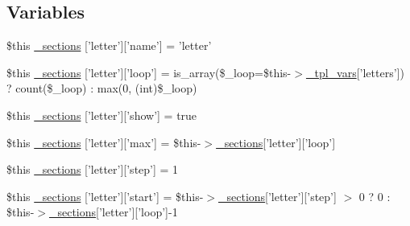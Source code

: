 \subsection*{\-Variables}
\begin{DoxyCompactItemize}
\item 
\$this \hyperlink{34d6fa4bfd5eef6424a9ddc74a166350_2_06_06-19_05_06_06-1910644431_05basicindex_8tpl_8php_ab61c28556ae2c3aa9f08b3c37b8d1dee}{\-\_\-sections} \mbox{[}'letter'\mbox{]}\mbox{[}'name'\mbox{]} = 'letter'
\item 
\$this \hyperlink{34d6fa4bfd5eef6424a9ddc74a166350_2_06_06-19_05_06_06-1910644431_05basicindex_8tpl_8php_ae48204adfd4d0ee93936b1c80c177329}{\-\_\-sections} \mbox{[}'letter'\mbox{]}\mbox{[}'loop'\mbox{]} = is\-\_\-array(\$\-\_\-loop=\$this-\/$>$\hyperlink{_06_06127_05_06_0612781687_05pkgelementindex_8tpl_8php_a4a4846d8e68d455590131a05697f67a3}{\-\_\-tpl\-\_\-vars}\mbox{[}'letters'\mbox{]}) ? count(\$\-\_\-loop) \-: max(0, (int)\$\-\_\-loop)
\item 
\$this \hyperlink{34d6fa4bfd5eef6424a9ddc74a166350_2_06_06-19_05_06_06-1910644431_05basicindex_8tpl_8php_a0df4abbde93015148031ad45c6ab77dd}{\-\_\-sections} \mbox{[}'letter'\mbox{]}\mbox{[}'show'\mbox{]} = true
\item 
\$this \hyperlink{34d6fa4bfd5eef6424a9ddc74a166350_2_06_06-19_05_06_06-1910644431_05basicindex_8tpl_8php_a37080233bfe88cede401c74aaa2c203d}{\-\_\-sections} \mbox{[}'letter'\mbox{]}\mbox{[}'max'\mbox{]} = \$this-\/$>$\hyperlink{_06_06127_05_06_0612781687_05pkgelementindex_8tpl_8php_a9e3d26b39edfe29c3f29b8035ef33828}{\-\_\-sections}\mbox{[}'letter'\mbox{]}\mbox{[}'loop'\mbox{]}
\item 
\$this \hyperlink{34d6fa4bfd5eef6424a9ddc74a166350_2_06_06-19_05_06_06-1910644431_05basicindex_8tpl_8php_a6337b688bdd972398487eb8159a4990b}{\-\_\-sections} \mbox{[}'letter'\mbox{]}\mbox{[}'step'\mbox{]} = 1
\item 
\$this \hyperlink{34d6fa4bfd5eef6424a9ddc74a166350_2_06_06-19_05_06_06-1910644431_05basicindex_8tpl_8php_a024abd6dfcb3c2d12aa3af3d9e5e2f7a}{\-\_\-sections} \mbox{[}'letter'\mbox{]}\mbox{[}'start'\mbox{]} = \$this-\/$>$\hyperlink{_06_06127_05_06_0612781687_05pkgelementindex_8tpl_8php_a9e3d26b39edfe29c3f29b8035ef33828}{\-\_\-sections}\mbox{[}'letter'\mbox{]}\mbox{[}'step'\mbox{]} $>$ 0 ? 0 \-: \$this-\/$>$\hyperlink{_06_06127_05_06_0612781687_05pkgelementindex_8tpl_8php_a9e3d26b39edfe29c3f29b8035ef33828}{\-\_\-sections}\mbox{[}'letter'\mbox{]}\mbox{[}'loop'\mbox{]}-\/1
\item 

\end{DoxyCompactItemize}
